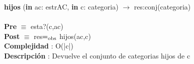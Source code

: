 	\textbf{hijos} (\textbf{in} ac: estrAC, \textbf{in} c: categoria) $\longrightarrow$ res:conj(categoria)\\\\
	\textbf{Pre} $\equiv$ {esta?(c,ac)}\\
	\textbf{Post} $\equiv$ {res$=_{\mathrm{obs}}$ hijos(ac,c)}\\
	\textbf{Complejidad} : O(|c|)\\
	\textbf{Descripci\'{o}n} : Devuelve el conjunto de categorias hijos de c\\
